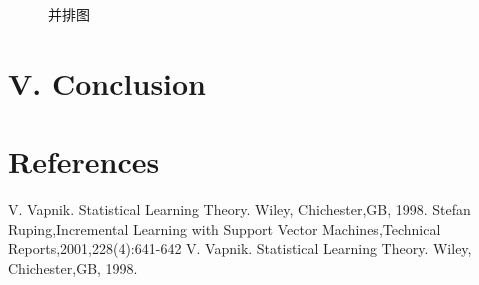 \documentclass{article}
\begin{document}
\begin{figure}[h]
  \caption{并排图}
\end{figure}

\section{V.	Conclusion}


\section{References}

\begin{thebibliography}{10}
    V. Vapnik. Statistical Learning Theory. Wiley, Chichester,GB, 1998.
    Stefan Ruping,Incremental Learning with Support Vector Machines,Technical Reports,2001,228(4):641-642
    V. Vapnik. Statistical Learning Theory. Wiley, Chichester,GB, 1998.
\end{thebibliography}
\end{document}

